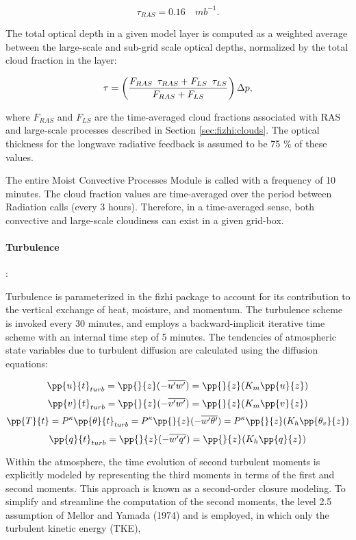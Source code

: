 \[ \tau_{RAS} = 0.16 \quad mb^{-1} . \]

The total optical depth in a given model layer is computed as a weighted average between
the large-scale and sub-grid scale optical depths, normalized by the total cloud fraction in the
layer:

\[ \tau = \left( {F_{RAS} \,\,\, \tau_{RAS} + F_{LS} \,\,\, \tau_{LS} \over F_{RAS}+F_{LS} } \right) \Delta p, \]

where $F_{RAS}$ and $F_{LS}$ are the time-averaged cloud fractions associated with RAS and large-scale
processes described in Section \ref{sec:fizhi:clouds}.
The optical thickness for the longwave radiative feedback is assumed to be 75 $\%$ of these values.

The entire Moist Convective Processes Module is called with a frequency of 10 minutes. 
The cloud fraction values are time-averaged over the period between Radiation calls (every 3
hours).  Therefore, in a time-averaged sense, both convective and large-scale 
cloudiness can exist in a given grid-box.  

\paragraph{Turbulence}:

Turbulence is parameterized in the fizhi package to account for its contribution to the
vertical exchange of heat, moisture, and momentum.  
The turbulence scheme is invoked every 30 minutes, and employs a backward-implicit iterative 
time scheme with an internal time step of 5 minutes.
The tendencies of atmospheric state variables due to turbulent diffusion are calculated using
the diffusion equations:

\[
{\pp{u}{t}}_{turb} = {\pp{}{z} }{(- \overline{u^{\prime}w^{\prime}})}
 = {\pp{}{z} }{(K_m \pp{u}{z})}
\]
\[
{\pp{v}{t}}_{turb} = {\pp{}{z} }{(- \overline{v^{\prime}w^{\prime}})}
 = {\pp{}{z} }{(K_m \pp{v}{z})}
\]
\[
{\pp{T}{t}} = P^{\kappa}{\pp{\theta}{t}}_{turb} = 
P^{\kappa}{\pp{}{z} }{(- \overline{w^{\prime}\theta^{\prime}})}
 = P^{\kappa}{\pp{}{z} }{(K_h \pp{\theta_v}{z})}
\]
\[
{\pp{q}{t}}_{turb} = {\pp{}{z} }{(- \overline{w^{\prime}q^{\prime}})}
 = {\pp{}{z} }{(K_h \pp{q}{z})}
\]

Within the atmosphere, the time evolution
of second turbulent moments is explicitly modeled by representing the third moments in terms of 
the first and second moments.  This approach is known as a second-order closure modeling.
To simplify and streamline the computation of the second moments, the level 2.5 assumption
of Mellor and Yamada (1974) and \cite{yam:77} is employed, in which only the turbulent 
kinetic energy (TKE),

